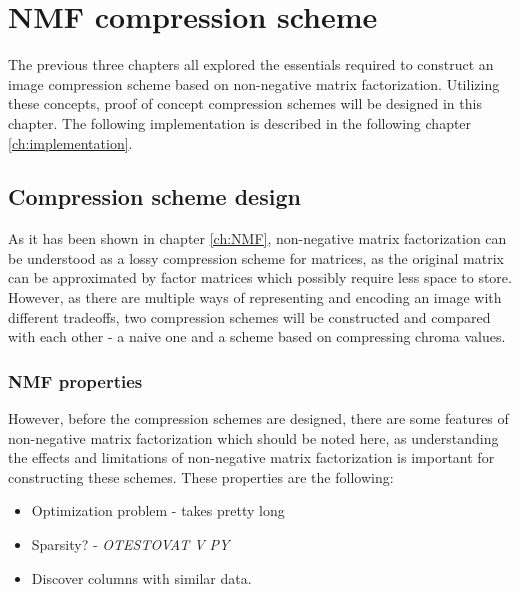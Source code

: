 \documentclass[thesis=M,english]{FITthesis}[2012/10/20]
\begin{document}


\chapter{NMF compression scheme}

The previous three chapters all explored the essentials required to construct an image
compression scheme based on non-negative matrix factorization. Utilizing these concepts,
proof of concept compression schemes will be designed in this chapter. The following
implementation is described in the following chapter \ref{ch:implementation}.


\section{Compression scheme design}
As it has been shown in chapter \ref{ch:NMF}, non-negative matrix factorization
can be understood as a lossy compression scheme for matrices, as the original
matrix can be approximated by factor matrices which possibly require less
space to store. However, as there are multiple ways of representing and encoding
an image with different tradeoffs, two compression schemes will be constructed
and compared with each other - a naive one and a scheme based on compressing
chroma values.


\subsection{NMF properties}
However, before the compression schemes are designed, there are some features
of non-negative matrix factorization which should be noted here, as understanding
the effects and limitations of non-negative matrix factorization is important for
constructing these schemes. These properties are the following:
\begin{itemize}
  \item Optimization problem - takes pretty long
  \item Sparsity? - \emph{OTESTOVAT V PY}
  \item Discover columns with similar data.
\end{itemize}
\end{document}
